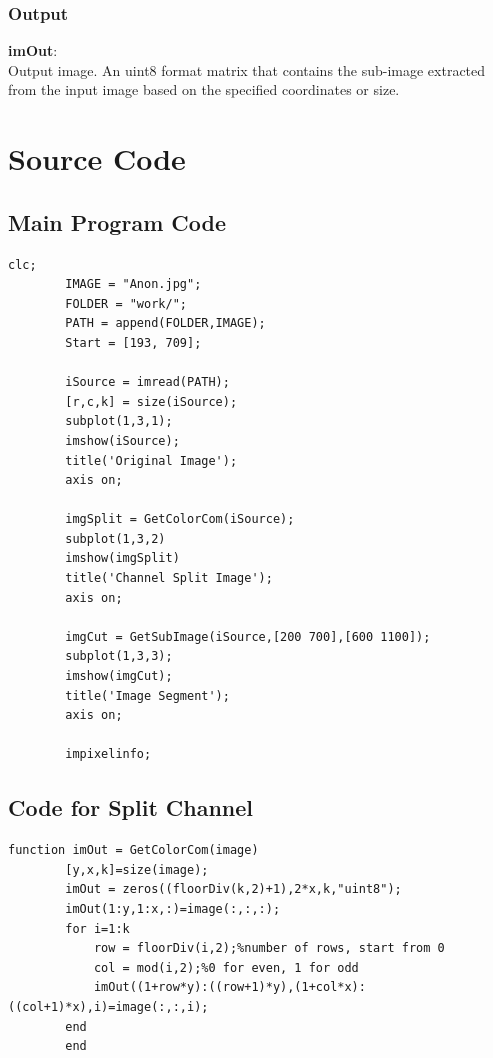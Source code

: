 \documentclass[a4paper,11pt]{article}
\begin{document}
\subsubsection*{Output}
\textbf{imOut}:\\
Output image. An uint8 format matrix that contains the sub-image extracted from the input image based on the specified coordinates or size.

\section{Source Code}
\subsection{Main Program Code}
\lstset{language = Matlab}
    \begin{lstlisting}[basicstyle=\tiny]
        clc;
        IMAGE = "Anon.jpg";
        FOLDER = "work/";
        PATH = append(FOLDER,IMAGE);
        Start = [193, 709];
        
        iSource = imread(PATH);
        [r,c,k] = size(iSource);
        subplot(1,3,1);
        imshow(iSource);
        title('Original Image');
        axis on;
        
        imgSplit = GetColorCom(iSource);
        subplot(1,3,2)
        imshow(imgSplit)
        title('Channel Split Image');
        axis on;
        
        imgCut = GetSubImage(iSource,[200 700],[600 1100]);
        subplot(1,3,3);
        imshow(imgCut);
        title('Image Segment');
        axis on;
        
        impixelinfo;
\end{lstlisting}

\subsection{Code for Split Channel}
\lstset{language = Matlab}
    \begin{lstlisting}[basicstyle=\tiny]
        function imOut = GetColorCom(image)
        [y,x,k]=size(image);
        imOut = zeros((floorDiv(k,2)+1),2*x,k,"uint8");
        imOut(1:y,1:x,:)=image(:,:,:);
        for i=1:k
            row = floorDiv(i,2);%number of rows, start from 0
            col = mod(i,2);%0 for even, 1 for odd
            imOut((1+row*y):((row+1)*y),(1+col*x):((col+1)*x),i)=image(:,:,i);
        end
        end
\end{lstlisting}
\end{document}
